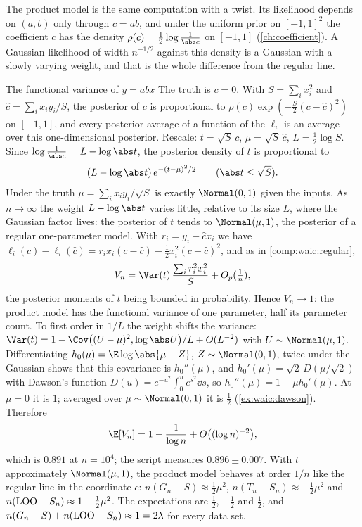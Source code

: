 \begin{refsection}
The product model is the same computation with a twist. Its likelihood depends on $(a,b)$ only through $c=ab$, and under the uniform prior on $[-1,1]^2$ the coefficient $c$ has the density $\rho(c)=\tfrac12\log\frac1{\abs c}$ on $[-1,1]$ (\cref{ch:coefficient}). A Gaussian likelihood of width $n^{-1/2}$ against this density is a Gaussian with a slowly varying weight, and that is the whole difference from the regular line.

\begin{computation}{The functional variance of $y=abx$}\label{comp:waic:product}
\step The truth is $c=0$. With $S=\sum_ix_i^2$ and $\hat c=\sum_ix_iy_i/S$, the posterior of $c$ is proportional to $\rho(c)\exp(-\tfrac S2(c-\hat c)^2)$ on $[-1,1]$, and every posterior average of a function of the $\ell_i$ is an average over this one-dimensional posterior.
\step Rescale: $t=\sqrt S\,c$, $\mu=\sqrt S\,\hat c$, $L=\tfrac12\log S$. Since $\log\frac1{\abs c}=L-\log\abs t$, the posterior density of $t$ is proportional to
\[
(L-\log\abs t)\,e^{-(t-\mu)^2/2}\qquad(\abs t\le\sqrt S).
\]
Under the truth $\mu=\sum_ix_iy_i/\sqrt S$ is exactly $\Normal(0,1)$ given the inputs. As $n\to\infty$ the weight $L-\log\abs t$ varies little, relative to its size $L$, where the Gaussian factor lives: the posterior of $t$ tends to $\Normal(\mu,1)$, the posterior of a regular one-parameter model.
\step With $r_i=y_i-\hat cx_i$ we have $\ell_i(c)-\ell_i(\hat c)=r_ix_i(c-\hat c)-\tfrac12x_i^2(c-\hat c)^2$, and as in \cref{comp:waic:regular},
\[
V_n=\Var(t)\,\frac{\sum_ir_i^2x_i^2}{S}+O_p(\tfrac1n),
\]
the posterior moments of $t$ being bounded in probability. Hence $V_n\to1$: the product model has the functional variance of one parameter, half its parameter count.
\step To first order in $1/L$ the weight shifts the variance: $\Var(t)=1-\Cov\bigl((U-\mu)^2,\log\abs U\bigr)/L+O(L^{-2})$ with $U\sim\Normal(\mu,1)$. Differentiating $h_0(\mu)=\E\log\abs{\mu+Z}$, $Z\sim\Normal(0,1)$, twice under the Gaussian shows that this covariance is $h_0''(\mu)$, and $h_0'(\mu)=\sqrt2\,D(\mu/\sqrt2)$ with Dawson's function $D(u)=e^{-u^2}\int_0^ue^{s^2}\dd s$, so $h_0''(\mu)=1-\mu h_0'(\mu)$. At $\mu=0$ it is $1$; averaged over $\mu\sim\Normal(0,1)$ it is $\tfrac12$ (\cref{ex:waic:dawson}). Therefore
\[
\E[V_n]=1-\frac{1}{\log n}+O\bigl((\log n)^{-2}\bigr),
\]
which is $0.891$ at $n=10^4$; the script measures $0.896\pm0.007$.
\step With $t$ approximately $\Normal(\mu,1)$, the product model behaves at order $1/n$ like the regular line in the coordinate $c$: $n(G_n-S)\approx\tfrac12\mu^2$, $n(T_n-S_n)\approx-\tfrac12\mu^2$ and $n(\mathrm{LOO}-S_n)\approx1-\tfrac12\mu^2$. The expectations are $\tfrac12$, $-\tfrac12$ and $\tfrac12$, and $n(G_n-S)+n(\mathrm{LOO}-S_n)\approx1=2\lambda$ for every data set.
\end{computation}


\end{refsection}
